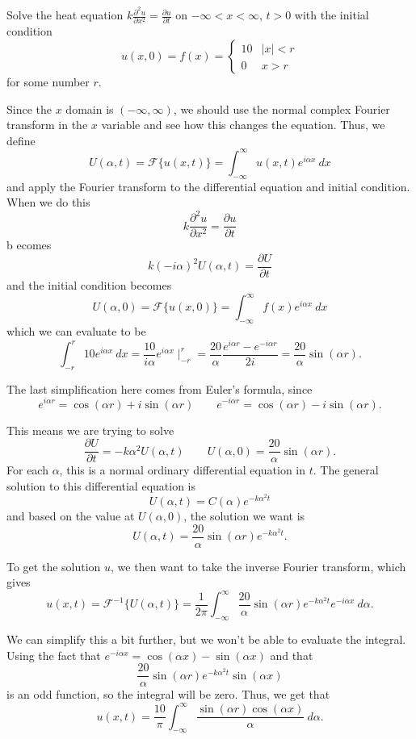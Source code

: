 \documentclass{ximera}
\begin{document}
\begin{example}
    Solve the heat equation $ k \frac{\partial^2 u}{\partial x^2} = \frac{\partial u}{\partial t}$ on $-\infty < x < \infty$, $t >0$ with the initial condition
    \[ 
        u(x, 0) = f(x) = 
        \begin{cases}
            10 & |x| < r \\ 
            0 & x > r
        \end{cases} 
    \] 
    for some number $r$. 
\end{example}

\begin{exampleSol}
    Since the $x$ domain is $(-\infty, \infty)$, we should use the normal complex Fourier transform in the $x$ variable and see how this changes the equation. Thus, we define
    \[ 
        U(\alpha, t) = \mathcal{F}\{u(x, t)\} = \int_{-\infty}^\infty u(x,t)e^{i \alpha x}\ dx 
    \] 
    and apply the Fourier transform to the differential equation and initial condition. When we do this
    \[
        k \frac{\partial^2 u}{\partial x^2} = \frac{\partial u}{\partial t} 
    \] b
    ecomes
    \[ 
        k(-i \alpha)^2 U(\alpha, t) = \frac{\partial U}{\partial t} 
    \] 
    and the initial condition becomes
    \[ 
        U(\alpha, 0) = \mathcal{F}\{u(x, 0)\} = \int_{-\infty}^\infty f(x)e^{i\alpha x}\ dx 
    \] 
    which we can evaluate to be
    \[ 
        \int_{-r}^r 10e^{i\alpha x}\ dx = \frac{10}{i\alpha}e^{i\alpha x}\mid_{-r}^r = \frac{20}{\alpha} \frac{e^{i\alpha r} - e^{-i\alpha r}}{2i} = \frac{20}{\alpha}\sin(\alpha r). 
    \]
    
    The last simplification here comes from Euler's formula, since
    \[ 
        e^{i\alpha r} = \cos(\alpha r) + i\sin(\alpha r) \qquad e^{-i\alpha r} = \cos(\alpha r) - i\sin(\alpha r). 
    \]
    
    This means we are trying to solve
    \[ 
        \frac{\partial U}{\partial t} = -k\alpha^2 U(\alpha, t) \qquad U(\alpha, 0) = \frac{20}{\alpha}\sin(\alpha r). 
    \] 
    For each $\alpha$, this is a normal ordinary differential equation in $t$. The general solution to this differential equation is
    \[ 
        U(\alpha, t) = C(\alpha)e^{-k\alpha^2 t} 
    \] 
    and based on the value at $U(\alpha, 0)$, the solution we want is
    \[
        U(\alpha, t) = \frac{20}{\alpha} \sin(\alpha r)e^{-k\alpha^2 t}. 
    \]
    
    To get the solution $u$, we then want to take the inverse Fourier transform, which gives
    \[
        u(x,t) = \mathcal{F}^{-1}\{U(\alpha, t)\} = \frac{1}{2\pi} \int_{-\infty}^\infty \frac{20}{\alpha} \sin(\alpha r)e^{-k\alpha^2 t} e^{-i\alpha x}\ d\alpha. 
    \]
    
    We can simplify this a bit further, but we won't be able to evaluate the integral. Using the fact that $e^{-i\alpha x} = \cos(\alpha x) - \sin(\alpha x)$ and that
    \[ 
        \frac{20}{\alpha} \sin(\alpha r)e^{-k\alpha^2 t} \sin(\alpha x) 
    \] 
    is an odd function, so the integral will be zero. Thus, we get that
    \[ 
        u(x,t) = \frac{10}{\pi} \int_{-\infty}^\infty \frac{\sin(\alpha r)\cos(\alpha x)}{\alpha}\ d\alpha. 
    \]
\end{exampleSol}
\end{document}
